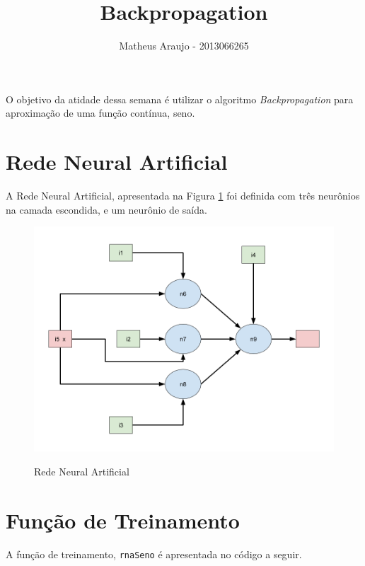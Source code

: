 \documentclass{article}
\begin{document}


\title{Backpropagation}
\author{Matheus Araujo - 2013066265}
\date{}

\maketitle

O objetivo da atidade dessa semana é utilizar o algoritmo \emph{Backpropagation} para aproximação de uma função contínua, seno.

\section{Rede Neural Artificial}

A Rede Neural Artificial, apresentada na Figura \ref{fig:rede_seno} foi definida com três neurônios na camada escondida, e um neurônio de saída.

\begin{figure}[h]
  \includegraphics{rede_seno}
  \label{fig:rede_seno}
  \caption{Rede Neural Artificial}
\end{figure}

\section{Função de Treinamento}

A função de treinamento, \texttt{rnaSeno} é apresentada no código a seguir.
\end{document}
